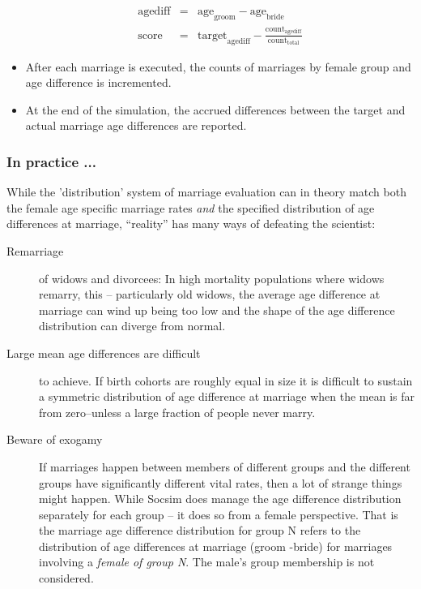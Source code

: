 \begin{itemize}
  \begin{eqnarray}
    \mathrm{agediff} &=& \mathrm{age}_{\mathrm{groom}} - \mathrm{age}_{\mathrm{bride}} \\    \label{eq:mscore}
    \mathrm{score} &=& \mathrm{target}_{\mathrm{agediff}} - \frac{\mathrm{count}_{\mathrm{agediff}}}{\mathrm{count}_{\mathrm{total}}}
  \end{eqnarray}


\item After each marriage is executed, the counts of marriages by
  female group and age difference is incremented.

\item At the end of the simulation, the accrued differences between the target
  and actual marriage age differences are reported.

\end{itemize}

\subsubsection{In practice ...}
\label{sec:inpractice}

While the 'distribution' system of marriage evaluation can in theory
match both the female age specific marriage rates \emph{and} the
specified distribution of age differences at marriage, ``reality'' has
many ways of defeating the scientist:

\begin{description}
\item[Remarriage] of widows and divorcees: In high mortality
  populations where widows remarry, this -- particularly old widows,
  the average age difference at marriage can wind up being too low and
  the shape of the age difference distribution can diverge from
  normal.

\item[Large mean age differences are difficult] to achieve.  If
  birth cohorts are roughly equal in size it is difficult to sustain a
  symmetric distribution of age difference at marriage when the mean is
  far from zero--unless a large fraction of people never marry.  

\item[Beware of exogamy] If marriages happen between members of
  different groups and the different groups have significantly
  different vital rates, then a lot of strange things might happen.
  While Socsim does manage the age difference distribution separately
  for each group -- it does so from a female perspective. That is the
  marriage age difference distribution for group N refers to the
  distribution of age differences at marriage (groom -bride) for
  marriages involving a \emph{female of group N}. The male's group
  membership is not considered.
\end{description}


